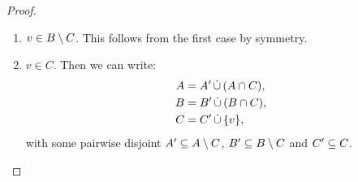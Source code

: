 \begin{proof}
\begin{enumerate}[label=(\roman*)]
    The local Markov property for $v$ now implies:
    \begin{align*}
    &&X_v \Indep_{R}  X_{(V \cup J) \sm \{v\}} \given X_D\\ 
    &\xRightarrow{\text{decomposition}} & 
    X_v \Indep_{R}  X_{A'}, X_{B'}, X_C \given X_D \\
    & \xRightarrow{\text{weak union}}  & 
    X_v \Indep_{R} X_{B'} \given X_{A'}, X_C, X_D \\ 
    & \xRightarrow{\text{contraction}\eqref{eqn:bla}}  & X_v, X_D  \Indep_{R}  X_{B'} \given X_{A'}, X_C \\
    & \xRightarrow{\text{decomposition}}  & X_v \Indep_{R}  X_{B'} \given X_{A'}, X_C\\
    & \xRightarrow{\text{contraction} \eqref{eqn:bli}}  &  X_{A'},X_v \Indep_{R}  X_{B'} \given X_C\\
    & \xRightarrow{\text{redundancy}}  & X_{A'}, X_v \Indep_{R}  X_B \given X_C.
     \tag{\#3}
    \end{align*}
    From redundancy we get the implications:
    \begin{align*}
      &&X_{A\sm C} \Indep_{R} X_B \given X_{A'},X_v,X_C\\
    & \xRightarrow{\text{contraction} \eqref{eqn:bloop}}  &  
      X_{A'},X_v,X_{A\sm C} \Indep_{R}  X_B \given X_C\\
    & \xRightarrow{\text{decomposition}}  &    
    X_A \Indep_{R}  X_B \given X_C. 
    \end{align*}
    This shows the claim in the first case.

  \item $v \in B\setminus C$. This follows from the first case by symmetry.

  \item $v \in C$.
     Then we can write:
    \begin{align*}
        A &= A' \,\dot{\cup}\, (A \cap C), \\
        B &= B' \,\dot{\cup}\, (B \cap C),\\
        C &= C' \,\dot{\cup}\, \{v\},
    \end{align*}
    with some pairwise disjoint $A' \subseteq A \setminus C$, 
    $B' \subseteq B \setminus C$ and
    $C' \subseteq C$.


\end{enumerate}
\end{proof}
